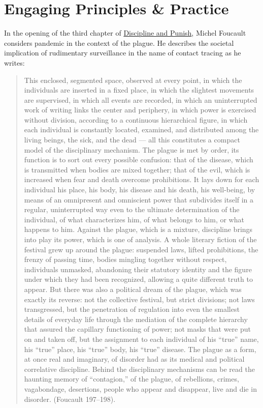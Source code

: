 \documentclass[11pt,dvipdfm]{article}
\begin{document}
\section{Engaging Principles \& Practice}
In the opening of the third chapter of \underline{Discipline and Punish}, Michel Foucault considers pandemic in the context of the plague.  He describes the societal implication of rudimentary surveillance in the name of contact tracing as he writes: 
\begin{quote}
	This enclosed, segmented space, observed at every point, in which the individuals are inserted in a fixed place, in which the slightest movements are supervised, in which all events are recorded, in which an uninterrupted work of writing links the center and periphery, in which power is exercised without division, according to a continuous hierarchical figure, in which each individual is constantly located, examined, and distributed among the living beings, the sick, and the dead –-- all this constitutes a compact model of the disciplinary mechanism.  The plague is met by order, its function is to sort out every possible confusion:  that of the disease, which is transmitted when bodies are mixed together; that of the evil, which is increased when fear and death overcome prohibitions.  It lays down for each individual his place, his body, his disease and his death, his well-being, by means of an omnipresent and omniscient power that subdivides itself in a regular, uninterrupted way even to the ultimate determination of the individual, of what characterizes him, of what belongs to him, or what happens to him.  Against the plague, which is a mixture, discipline brings into play its power, which is one of analysis.  A whole literary fiction of the festival grew up around the plague:  suspended laws, lifted prohibitions, the frenzy of passing time, bodies mingling together without respect, individuals unmasked, abandoning their statutory identity and the figure under which they had been recognized, allowing a quite different truth to appear.  But there was also a political dream of the plague, which was exactly its reverse:  not the collective festival, but strict divisions; not laws transgressed, but the penetration of regulation into even the smallest details of everyday life through the mediation of the complete hierarchy that assured the capillary functioning of power; not masks that were put on and taken off, but the assignment to each individual of his ``true'' name, his ``true'' place, his ``true'' body, his ``true'' disease.  The plague as a form, at once real and imaginary, of disorder had as its medical and political correlative discipline.  Behind the disciplinary mechanisms can be read the haunting memory of “contagion,” of the plague, of rebellions, crimes, vagabondage, desertions, people who appear and disappear, live and die in disorder. (Foucault 197--198).
\end{quote}
\end{document}
